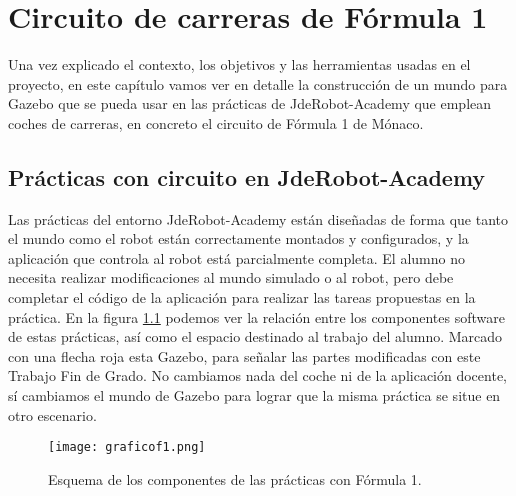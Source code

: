\chapter{Circuito de carreras de Fórmula 1}
\label{ch:circuitocarreras}

Una vez explicado el contexto, los objetivos y las herramientas usadas en el proyecto, en este capítulo vamos ver en detalle la construcción de un mundo para Gazebo que se pueda usar en las prácticas de JdeRobot-Academy que emplean coches de carreras, en concreto el circuito de Fórmula 1 de Mónaco.

\section{Prácticas con circuito en JdeRobot-Academy}
\label{sec:circarr_practicas}

Las prácticas del entorno JdeRobot-Academy están diseñadas de forma que tanto el mundo como el robot están correctamente montados y configurados, y la aplicación que controla al robot está parcialmente completa. El alumno no necesita realizar modificaciones al mundo simulado o al robot, pero debe completar el código de la aplicación para realizar las tareas propuestas en la práctica. En la figura \ref{fig:graficof1} podemos ver la relación entre los componentes software de estas prácticas, así como el espacio destinado al trabajo del alumno. Marcado con una flecha roja esta Gazebo, para señalar las partes modificadas con este Trabajo Fin de Grado. No cambiamos nada del coche ni de la aplicación docente, sí cambiamos el mundo de Gazebo para lograr que la misma práctica se situe en otro escenario.

\begin{figure}[h]
	\centering
	\texttt{[image: graficof1.png]}
	\caption{Esquema de los componentes de las prácticas con Fórmula 1.} \label{fig:graficof1}
\end{figure}

